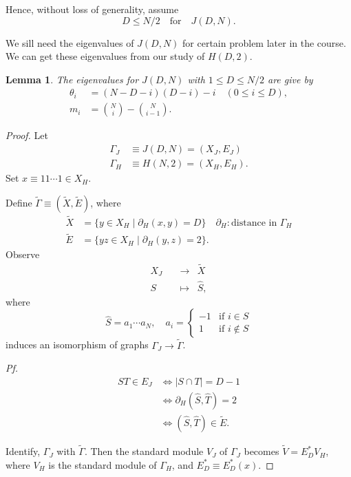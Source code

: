 \documentclass[
]{book}
\newtheorem{lemma}{Lemma}[chapter]
\theoremstyle{definition}
\theoremstyle{definition}
\theoremstyle{definition}
\theoremstyle{definition}
\theoremstyle{remark}
\begin{document}
Hence, without loss of generality, assume
\[D\leq N/2 \quad \text{for} \quad J(D,N).\]

We sill need the eigenvalues of \(J(D,N)\) for certain problem later in the course. We can get these eigenvalues from our study of \(H(D,2)\).

\begin{lemma}
The eigenvalues for \(J(D,N)\) with \(1\leq D \leq N/2\) are give by
\begin{align}
\theta_i & = (N-D-i)(D-i) - i \quad (0\leq i\leq D),\\
m_i & = \binom{N}{i} - \binom{N}{i-1}.
\end{align}
\end{lemma}

\begin{proof}
Let
\begin{align}
\Gamma_J & \equiv J(D,N) = (X_J, E_J)\\
\Gamma_H & \equiv H(N,2) = (X_H, E_H).
\end{align}
Set \(x \equiv 11\cdots 1 \in X_H\).

Define \(\tilde{\Gamma} \equiv (\tilde{X}, \tilde{E})\), where
\begin{align}
\tilde{X} & = \{y\in X_H \mid \partial_H(x,y) = D\} \quad \partial_H:\text{distance in }\Gamma_H\\
\tilde{E} & = \{yz\in X_H \mid \partial_H(y,z) = 2\}.
\end{align}
Observe
\begin{align}
X_J & \quad \to & \tilde{X}\\
S & \quad \mapsto & \hat{S},
\end{align}
where
\[\hat{S} = a_1\cdots a_N, \quad a_i = \begin{cases} -1 & \text{if }i\in S\\ 1 & \text{if }i\not\in S \end{cases}\]
induces an isomorphism of graphs \(\Gamma_J \to \tilde{\Gamma}\).

\emph{Pf.}
\begin{align}
ST \in E_J &\Leftrightarrow |S\cap T| = D-1\\
& \Leftrightarrow \partial_H(\hat{S}, \hat{T}) = 2\\
& \Leftrightarrow (\hat{S}, \hat{T})\in \tilde{E}.
\end{align}

Identify, \(\Gamma_J\) with \(\tilde{\Gamma}\). Then the standard module \(V_J\) of \(\Gamma_J\) becomes \(\tilde{V} = E^*_DV_H\), where \(V_H\) is the standard module of \(\Gamma_H\), and \(E^*_D \equiv E^*_D(x)\).


\end{proof}
\end{document}
